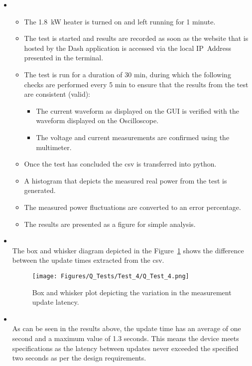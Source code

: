 \begin{itemize}
    \item [\emph{Steps followed in the test or experiment}]\mbox{}
    \begin{itemize}
        \item [Step 1:] The \qty{1.8}{\kW} heater is turned on and left running for 1 minute.
        \item [Step 2:] The test is started and results are recorded as soon as the website that is hosted by the Dash application is accessed via the local IP~Address presented in the terminal.
        \item [Step 3:] The test is run for a duration of 30 min, during which the following checks are performed every 5 min to ensure that the results from the test are consistent (valid):
        \begin{itemize}
            \item The current waveform as displayed on the GUI is verified with the waveform displayed on the Oscilloscope.
            \item The voltage and current measurements are confirmed using the multimeter. 
        \end{itemize}
        \item[Step 4:] Once the test has concluded the csv is transferred into python.
        \item[Step 5:] A histogram that depicts the measured real power from the test is generated.
        \item[Step 6:] The measured power fluctuations are converted to an error percentage.
        \item[Step 7:] The results are presented as a figure for simple analysis.
    \end{itemize}
    \item [\emph{Results or measurements}]\mbox{}\\
    The box and whisker diagram depicted in the Figure~\ref{fig:Q_Test_4} shows the difference between the update times extracted from the csv.
    \begin{figure}[H]
        \centering
        \texttt{[image: Figures/Q\_Tests/Test\_4/Q\_Test\_4.png]}
        \caption{Box and whisker plot depicting the variation in the measurement update latency.}
        \label{fig:Q_Test_4}
    \end{figure}
    \item [\emph{Observations}]\mbox{}\\
    As can be seen in the results above, the update time has an average of one second and a maximum value of 1.3 seconds. This means the device meets specifications as the latency between updates never exceeded the specified two seconds as per the design requirements.
\end{itemize}
